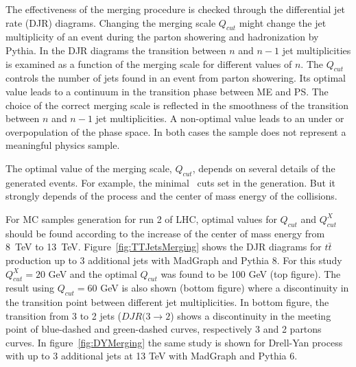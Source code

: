 The effectiveness of the merging procedure is checked through the differential jet rate (DJR) diagrams. Changing the merging scale $Q_{cut}$ might change the jet multiplicity of an event during the parton showering and hadronization by Pythia. In the DJR diagrams the transition between $n$ and $n-1$ jet multiplicities is examined as a function of the merging scale for different values of $n$. The $Q_{cut}$ controls the number of jets found in an event from parton showering. Its optimal value leads to a continuum in the transition phase between ME and PS. The choice of the correct merging scale is reflected in the smoothness of the transition between  $n$ and $n-1$ jet multiplicities. A non-optimal value leads to an under or overpopulation of the phase space. In both cases the sample does not represent a meaningful physics sample.

The optimal value of the merging scale, $Q_{cut}$, depends on several details of the generated events. For example, the minimal \pt~cuts set in the generation. But it strongly depends of the process and the center of mass energy of the collisions.

For MC samples generation for run 2 of LHC, optimal values for $Q_{cut}$ and $Q^{X}_{cut}$ should be found according to the increase of the center of mass energy from 8~TeV to 13~TeV. Figure~\ref{fig:TTJetsMerging} shows the DJR diagrams for $t\bar{t}$ production up to 3 additional jets with MadGraph and Pythia 8. For this study $Q^{X}_{cut}=20$ GeV and the optimal $Q_{cut}$ was found to be 100 GeV (top figure). The result using $Q_{cut}=60$ GeV is also shown (bottom figure) where a discontinuity in the transition point between different jet multiplicities. In bottom figure, the transition from 3 to 2 jets ($DJR(3\to 2$) shows a discontinuity in the meeting point of blue-dashed and green-dashed curves, respectively 3 and 2 partons curves. In figure~\ref{fig:DYMerging} the same study is shown for Drell-Yan process with up to 3 additional jets at 13 TeV with MadGraph and Pythia 6. 


